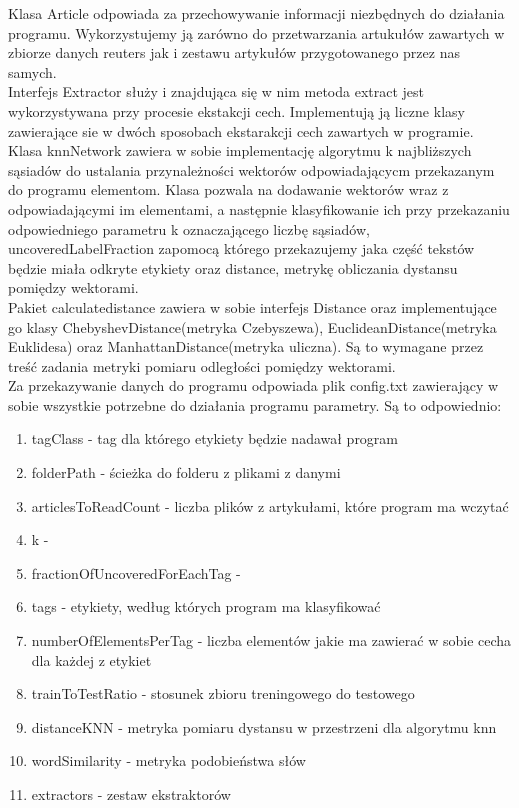 \documentclass{classrep}
\begin{document}
Klasa Article odpowiada za przechowywanie informacji niezbędnych do działania programu. Wykorzystujemy ją zarówno do przetwarzania artukułów zawartych w zbiorze danych reuters jak i zestawu artykułów przygotowanego przez nas samych.\\
Interfejs Extractor służy i znajdująca się w nim metoda extract jest wykorzystywana przy procesie ekstakcji cech. Implementują ją liczne klasy zawierające sie w dwóch sposobach ekstarakcji cech zawartych w programie.\\
Klasa knnNetwork zawiera w sobie implementację algorytmu k najbliższych sąsiadów do ustalania przynależności wektorów odpowiadającycm przekazanym do programu elementom. Klasa pozwala na dodawanie wektorów wraz z odpowiadającymi im elementami, a następnie klasyfikowanie ich przy przekazaniu odpowiedniego parametru k oznaczającego liczbę sąsiadów, uncoveredLabelFraction zapomocą którego przekazujemy jaka część tekstów będzie miała odkryte etykiety oraz distance, metrykę obliczania dystansu pomiędzy wektorami.\\
Pakiet calculatedistance zawiera w sobie interfejs Distance oraz implementujące go klasy ChebyshevDistance(metryka Czebyszewa), EuclideanDistance(metryka Euklidesa) oraz ManhattanDistance(metryka uliczna). Są to wymagane przez treść zadania metryki pomiaru odległości pomiędzy wektorami.\\
Za przekazywanie danych do programu odpowiada plik config.txt zawierający w sobie wszystkie potrzebne do działania programu parametry. Są to odpowiednio:
\begin{enumerate}
	\item tagClass - tag dla którego etykiety będzie nadawał program
	\item folderPath - ścieżka do folderu z plikami z danymi
	\item articlesToReadCount - liczba plików z artykułami, które program ma wczytać
	\item k - 
	\item fractionOfUncoveredForEachTag - 
	\item tags - etykiety, według których program ma klasyfikować
	\item numberOfElementsPerTag - liczba elementów jakie ma zawierać w sobie cecha dla każdej z etykiet
	\item trainToTestRatio - stosunek zbioru treningowego do testowego
	\item distanceKNN - metryka pomiaru dystansu w przestrzeni dla algorytmu knn
	\item wordSimilarity - metryka podobieństwa słów
	\item extractors - zestaw ekstraktorów
\end{enumerate}
\end{document}
